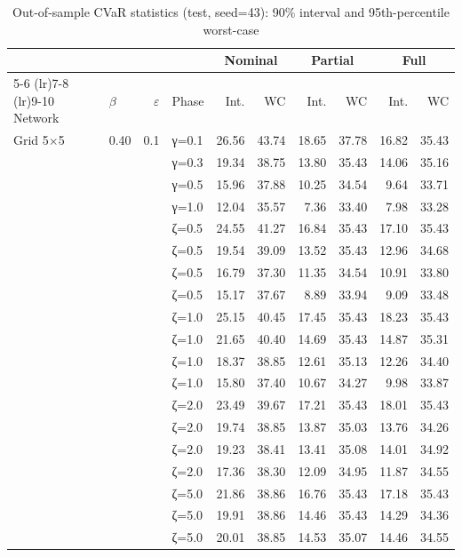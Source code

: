 \begin{table}[htbp]
\centering
\caption{Out-of-sample CVaR statistics (test, seed=43): 90\% interval and 95th-percentile worst-case}
\label{tab:oos_test}
\scriptsize
\begin{tabular}{ll r l  rr  rr  rr}
\toprule
 & & & & \multicolumn{2}{c}{Nominal} & \multicolumn{2}{c}{Partial} & \multicolumn{2}{c}{Full} \\
\cmidrule(lr){5-6} \cmidrule(lr){7-8} \cmidrule(lr){9-10}
Network & $\beta$ & $\varepsilon$ & Phase & Int. & WC & Int. & WC & Int. & WC \\
\midrule
 Grid 5$\times$5 & 0.40 & 0.1 & γ=0.1 & 26.56 & 43.74 & 18.65 & 37.78 & 16.82 & 35.43 \\
  &  &  & γ=0.3 & 19.34 & 38.75 & 13.80 & 35.43 & 14.06 & 35.16 \\
  &  &  & γ=0.5 & 15.96 & 37.88 & 10.25 & 34.54 & 9.64 & 33.71 \\
  &  &  & γ=1.0 & 12.04 & 35.57 & 7.36 & 33.40 & 7.98 & 33.28 \\
  &  &  & ζ=0.5 & 24.55 & 41.27 & 16.84 & 35.43 & 17.10 & 35.43 \\
  &  &  & ζ=0.5 & 19.54 & 39.09 & 13.52 & 35.43 & 12.96 & 34.68 \\
  &  &  & ζ=0.5 & 16.79 & 37.30 & 11.35 & 34.54 & 10.91 & 33.80 \\
  &  &  & ζ=0.5 & 15.17 & 37.67 & 8.89 & 33.94 & 9.09 & 33.48 \\
  &  &  & ζ=1.0 & 25.15 & 40.45 & 17.45 & 35.43 & 18.23 & 35.43 \\
  &  &  & ζ=1.0 & 21.65 & 40.40 & 14.69 & 35.43 & 14.87 & 35.31 \\
  &  &  & ζ=1.0 & 18.37 & 38.85 & 12.61 & 35.13 & 12.26 & 34.40 \\
  &  &  & ζ=1.0 & 15.80 & 37.40 & 10.67 & 34.27 & 9.98 & 33.87 \\
  &  &  & ζ=2.0 & 23.49 & 39.67 & 17.21 & 35.43 & 18.01 & 35.43 \\
  &  &  & ζ=2.0 & 19.74 & 38.85 & 13.87 & 35.03 & 13.76 & 34.26 \\
  &  &  & ζ=2.0 & 19.23 & 38.41 & 13.41 & 35.08 & 14.01 & 34.92 \\
  &  &  & ζ=2.0 & 17.36 & 38.30 & 12.09 & 34.95 & 11.87 & 34.55 \\
  &  &  & ζ=5.0 & 21.86 & 38.86 & 16.76 & 35.43 & 17.18 & 35.43 \\
  &  &  & ζ=5.0 & 19.91 & 38.86 & 14.46 & 35.43 & 14.29 & 34.36 \\
  &  &  & ζ=5.0 & 20.01 & 38.85 & 14.53 & 35.07 & 14.46 & 34.55 \\

\end{tabular}
\end{table}
